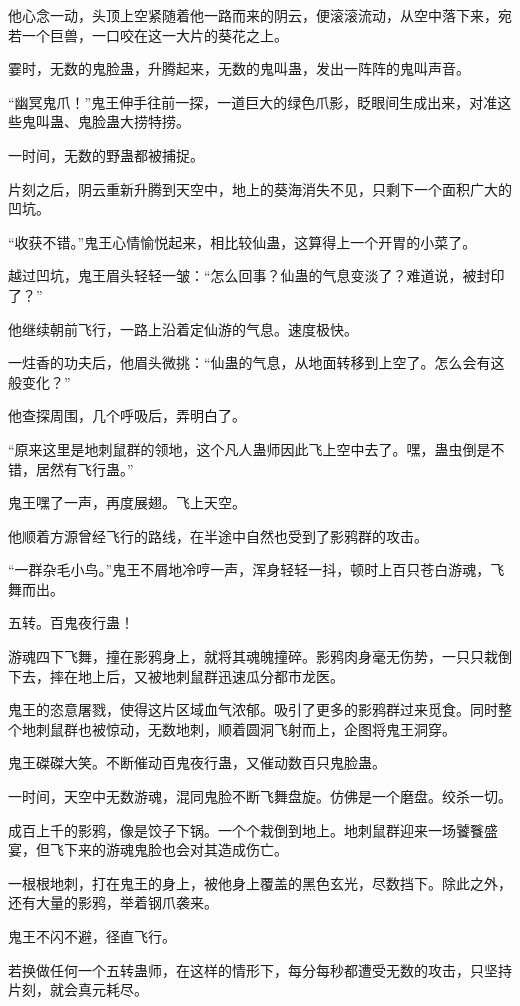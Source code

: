 \begin{this_body}
他心念一动，头顶上空紧随着他一路而来的阴云，便滚滚流动，从空中落下来，宛若一个巨兽，一口咬在这一大片的葵花之上。

霎时，无数的鬼脸蛊，升腾起来，无数的鬼叫蛊，发出一阵阵的鬼叫声音。

“幽冥鬼爪！”鬼王伸手往前一探，一道巨大的绿色爪影，眨眼间生成出来，对准这些鬼叫蛊、鬼脸蛊大捞特捞。

一时间，无数的野蛊都被捕捉。

片刻之后，阴云重新升腾到天空中，地上的葵海消失不见，只剩下一个面积广大的凹坑。

“收获不错。”鬼王心情愉悦起来，相比较仙蛊，这算得上一个开胃的小菜了。

越过凹坑，鬼王眉头轻轻一皱：“怎么回事？仙蛊的气息变淡了？难道说，被封印了？”

他继续朝前飞行，一路上沿着定仙游的气息。速度极快。

一炷香的功夫后，他眉头微挑：“仙蛊的气息，从地面转移到上空了。怎么会有这般变化？”

他查探周围，几个呼吸后，弄明白了。

“原来这里是地刺鼠群的领地，这个凡人蛊师因此飞上空中去了。嘿，蛊虫倒是不错，居然有飞行蛊。”

鬼王嘿了一声，再度展翅。飞上天空。

他顺着方源曾经飞行的路线，在半途中自然也受到了影鸦群的攻击。

“一群杂毛小鸟。”鬼王不屑地冷哼一声，浑身轻轻一抖，顿时上百只苍白游魂，飞舞而出。

五转。百鬼夜行蛊！

游魂四下飞舞，撞在影鸦身上，就将其魂魄撞碎。影鸦肉身毫无伤势，一只只栽倒下去，摔在地上后，又被地刺鼠群迅速瓜分都市龙医。

鬼王的恣意屠戮，使得这片区域血气浓郁。吸引了更多的影鸦群过来觅食。同时整个地刺鼠群也被惊动，无数地刺，顺着圆洞飞射而上，企图将鬼王洞穿。

鬼王磔磔大笑。不断催动百鬼夜行蛊，又催动数百只鬼脸蛊。

一时间，天空中无数游魂，混同鬼脸不断飞舞盘旋。仿佛是一个磨盘。绞杀一切。

成百上千的影鸦，像是饺子下锅。一个个栽倒到地上。地刺鼠群迎来一场饕餮盛宴，但飞下来的游魂鬼脸也会对其造成伤亡。

一根根地刺，打在鬼王的身上，被他身上覆盖的黑色玄光，尽数挡下。除此之外，还有大量的影鸦，举着钢爪袭来。

鬼王不闪不避，径直飞行。

若换做任何一个五转蛊师，在这样的情形下，每分每秒都遭受无数的攻击，只坚持片刻，就会真元耗尽。


\end{this_body}
